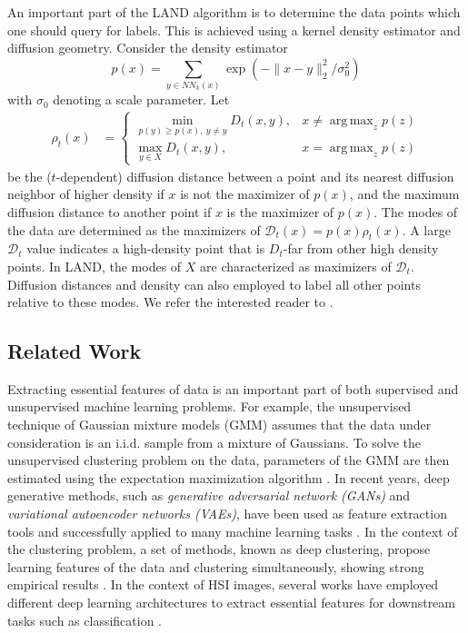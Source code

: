 \documentclass{article}
\newcommand{\Dt}{\mathcal{D}_{t}}
\DeclareMathOperator*{\argmax}{arg\,max}
\begin{document}
An important part of the LAND algorithm is to determine the data points which one should query for labels. This is achieved using a kernel density estimator and diffusion geometry.  Consider the density estimator 
\[
p(x)=\sum_{y\in NN_{k}(x)}\exp(-\|x-y\|_{2}^{2}/\sigma_{0}^{2})
\]
with $\sigma_0$ denoting a scale parameter. Let 
\begin{align}\label{eqn:rho}
\rho_{t}(x) &=
\begin{cases}
\displaystyle\min_{p(y)\ge p(x), \ y\neq y} D_{t}(x,y), &x\neq \argmax_{z}p(z) \\
\displaystyle\max_{y\in X} D_{t}(x,y), & x=\argmax_{z}p(z)
\end{cases}
\end{align} be the ($t$-dependent) diffusion distance between a point and its nearest diffusion neighbor of higher density if $x$ is not the maximizer of $p(x)$, and the maximum diffusion distance to another point if $x$ is the maximizer of $p(x)$.  The modes of the data are determined as the maximizers of $\Dt(x)=p(x)\rho_{t}(x)$.  A large $\Dt$ value indicates a high-density point that is $D_{t}$-far from other high density points. In LAND, the modes of $X$ are characterized as maximizers of $\Dt$. Diffusion distances and density can also employed to label all other points relative to these modes. We refer the interested reader to 
\cite{Maggioni2019_LAND}. 


\subsection{Related Work}
Extracting essential features of data is an important part of both supervised and unsupervised machine learning problems. For example, the unsupervised technique of Gaussian mixture models (GMM) assumes that the data under consideration is an i.i.d. sample from a mixture of Gaussians. To solve the unsupervised clustering problem on the data, parameters of the GMM are then estimated using the expectation maximization algorithm \cite{Murphy2012_Machine}. In recent years, deep generative methods, such as \emph{generative adversarial network (GANs)} and \emph{variational autoencoder networks (VAEs)}, have been used as feature extraction tools and successfully applied to many machine learning tasks \cite{ehsan2017infinite,makhzani2015adversarial}. In the context of the clustering problem, a set of methods, known as deep clustering, propose learning features of the data and clustering simultaneously, showing strong empirical results \cite{tian2014learning,song2013auto,xie2016unsupervised,jiang2017variational}. 
In the context of HSI images, several works have employed different deep learning architectures to extract essential features for downstream tasks such as classification
\cite{chen2014deep,chen2016deep,li2017spectral,he2017multi,paoletti2019deep,zhang20191d}. 
\end{document}
